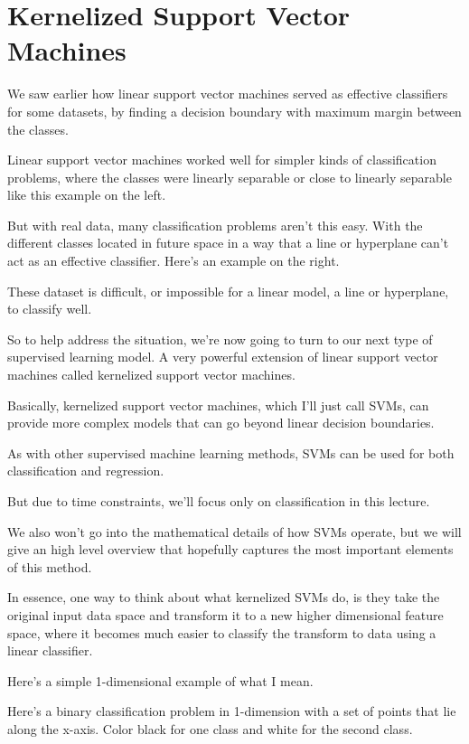 \section{Kernelized Support Vector Machines}
\begin{multicols}{2}

We saw earlier how linear support vector machines served as effective classifiers for some datasets, by finding a decision boundary with maximum margin between the classes. 

Linear support vector machines worked well for simpler kinds of classification problems, where the classes were linearly separable or close to linearly separable like this example on the left. 

But with real data, many classification problems aren't this easy. With the different classes located in future space in a way that a line or hyperplane can't act as an effective classifier. Here's an example on the right. 

These dataset is difficult, or impossible for a linear model, a line or hyperplane, to classify well. 

So to help address the situation, we're now going to turn to our next type of supervised learning model. A very powerful extension of linear support vector machines called kernelized support vector machines. 

Basically, kernelized support vector machines, which I'll just call SVMs, can provide more complex models that can go beyond linear decision boundaries. 

As with other supervised machine learning methods, SVMs can be used for both classification and regression. 

But due to time constraints, we'll focus only on classification in this lecture. 

We also won't go into the mathematical details of how SVMs operate, but we will give an high level overview that hopefully captures the most important elements of this method. 

In essence, one way to think about what kernelized SVMs do, is they take the original input data space and transform it to a new higher dimensional feature space, where it becomes much easier to classify the transform to data using a linear classifier. 

Here's a simple 1-dimensional example of what I mean. 

Here's a binary classification problem in 1-dimension with a set of points that lie along the x-axis. Color black for one class and white for the second class. 


\end{multicols}
